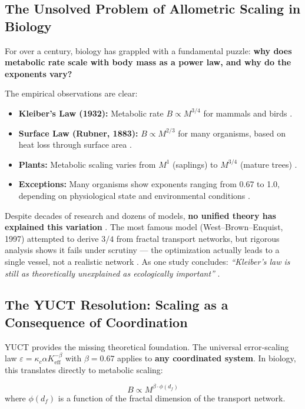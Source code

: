 \documentclass[12pt]{article}
\newcommand{\Keff}{K_{\mathrm{eff}}}
\begin{document}
	\subsection{The Unsolved Problem of Allometric Scaling in Biology}
	
	For over a century, biology has grappled with a fundamental puzzle: \textbf{why does metabolic rate scale with body mass as a power law, and why do the exponents vary?}
	
	The empirical observations are clear:
	\begin{itemize}
		\item \textbf{Kleiber's Law (1932):} Metabolic rate \(B \propto M^{3/4}\) for mammals and birds \cite{Kleiber1932,West1997}.
		\item \textbf{Surface Law (Rubner, 1883):} \(B \propto M^{2/3}\) for many organisms, based on heat loss through surface area \cite{Rubner1883}.
		\item \textbf{Plants:} Metabolic scaling varies from \(M^{1}\) (saplings) to \(M^{3/4}\) (mature trees) \cite{Reich2006}.
		\item \textbf{Exceptions:} Many organisms show exponents ranging from 0.67 to 1.0, depending on physiological state and environmental conditions \cite{Glazier2005}.
	\end{itemize}
	
	Despite decades of research and dozens of models, \textbf{no unified theory has explained this variation} \cite{Agutter2004}. The most famous model (West–Brown–Enquist, 1997) attempted to derive \(3/4\) from fractal transport networks, but rigorous analysis shows it fails under scrutiny — the optimization actually leads to a single vessel, not a realistic network \cite{Dodds2001}. As one study concludes: \textit{``Kleiber's law is still as theoretically unexplained as ecologically important''} \cite{Agutter2004}.
	
	\subsection{The YUCT Resolution: Scaling as a Consequence of Coordination}
	
	YUCT provides the missing theoretical foundation. The universal error‑scaling law \(\varepsilon = \kappa_c \alpha \Keff^{-\beta}\) with \(\beta = 0.67\) applies to \textbf{any coordinated system}. In biology, this translates directly to metabolic scaling:
	
	\begin{equation}
		B \propto M^{\beta \cdot \phi(d_f)}
	\end{equation}
	where \(\phi(d_f)\) is a function of the fractal dimension of the transport network.
	
\end{document}
